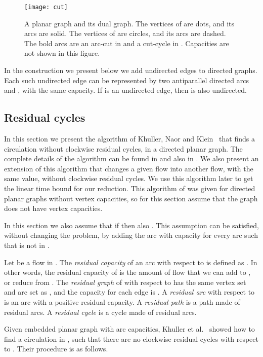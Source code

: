 \documentclass[a4paper,11pt]{article}
\begin{document}
\begin{figure}
    \centering
    \texttt{[image: cut]}
    \caption{A planar graph and its dual graph. The vertices of  are dots, and its arcs are solid. The vertices of  are circles, and its arcs are dashed. The bold arcs are an arc-cut in  and a cut-cycle in . Capacities are not shown in this figure.}
    \label{fig:Gd}
\end{figure}

In the construction we present below we add undirected edges to
directed graphs.
Each such undirected edge  can be represented by
two antiparallel
directed arcs  and , with the same capacity.
If  is
an undirected edge, then  is also undirected.

\subsection{Residual cycles} \label{sec:rcyc}

In this section we present the algorithm of Khuller, Naor and Klein~\cite{KNK93}
that finds a circulation without clockwise residual cycles, in a directed
planar graph. The complete details of the algorithm can be found in \cite{KNK93}
and also in \cite{BK}.
We also present an extension of this algorithm that changes a given flow into
another flow, with the same value, without clockwise residual cycles.
We use this algorithm later to get the linear time bound for our reduction.
This algorithm of \cite{KNK93} was given for directed planar graphs
without vertex capacities, so for this section assume that the graph 
does not have vertex capacities.

In this section we also assume that if  then also .
This assumption can be
satisfied, without changing the problem, by adding the arc  with
capacity  for every arc  such that  is not in .

Let  be a flow in .
The \emph{residual capacity} of an arc  with respect to  is defined as
. In other words, the residual capacity of 
is the amount of flow that we can add to , or reduce from .
The \emph{residual graph} of  with respect to  has the same vertex set
and arc set as , and the capacity for each edge  is .
A \emph{residual arc} with respect to  is an arc  with a positive
residual capacity.
A \emph{residual path} is a path made of residual arcs. A \emph{residual cycle} is a
cycle made of residual arcs.

Given embedded planar graph  with arc capacities,
 Khuller et al.~\cite{KNK93} showed how to
find a circulation  in , such that there are no
clockwise residual cycles with respect to .
Their procedure is as follows.
\end{document}
